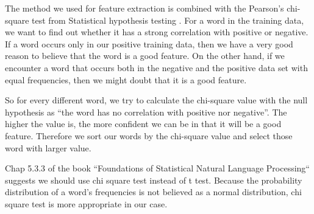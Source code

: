 \documentclass[a4paper]{article}
\begin{document}
The method we used for feature extraction is combined with the Pearson's chi-square test from Statistical hypothesis testing \cite{chi-square}. For a word in the training data, we want to find out whether it has a strong correlation with positive or negative. If a word occurs only in our positive training data, then we have a very good reason to believe that the word is a good feature. On the other hand, if we encounter a word that occurs both in the negative and the positive data set with equal frequencies, then we might doubt that it is a good feature.

So for every different word, we try to calculate the chi-square value with the null hypothesis as “the word has no correlation with positive nor negative”. The higher the value is, the more confident we can be in that it will be a good feature. Therefore we sort our words by the chi-square value and select those word with larger value.

Chap 5.3.3 of the book “Foundations of Statistical Natural Language Processing“ \cite{foundations} suggests we should use chi square test instead of t test. Because the probability distribution of a word’s frequencies is not believed as a normal distribution, chi square test is more appropriate in our case.
\end{document}

